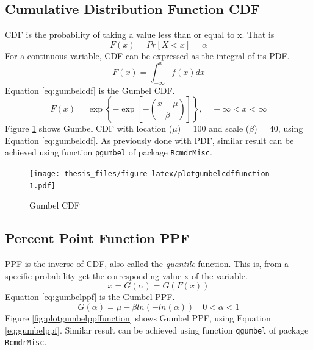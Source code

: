 \documentclass[12pt,oneside]{reedthesis}
\begin{document}
\hypertarget{cumulative-distribution-function-cdf}{%
\subsection{Cumulative Distribution Function CDF}\label{cumulative-distribution-function-cdf}}

CDF is the probability of taking a value less than or equal to x. That is
\begin{equation}
        F(x) = Pr[X < x] = \alpha
  \label{eq:cdf1}
\end{equation}
For a continuous variable, CDF can be expressed as the integral of its PDF.
\begin{equation}
        F(x) = \int_{-\infty}^x f(x)dx
  \label{eq:cdf2}
\end{equation}
Equation \eqref{eq:gumbelcdf} is the Gumbel CDF.
\begin{equation}
        F(x) = \exp\left\{-\exp\left[-\left(\frac{x-\mu}{\beta}\right)\right]\right\}, 
        \quad -\infty < x < \infty
  \label{eq:gumbelcdf}
\end{equation}
Figure \ref{fig:plotgumbelcdffunction} shows Gumbel CDF with location (\(\mu\)) = 100 and scale (\(\beta\)) = 40, using Equation \eqref{eq:gumbelcdf}. As previously done with PDF, similar result can be achieved using function \texttt{pgumbel} of package \texttt{RcmdrMisc}.

\footnotesize
\begin{figure}
\centering
\texttt{[image: thesis\_files/figure-latex/plotgumbelcdffunction-1.pdf]}
\caption{\label{fig:plotgumbelcdffunction}Gumbel CDF}
\end{figure}
\normalsize

\hypertarget{percent-point-function-ppf}{%
\subsection{Percent Point Function PPF}\label{percent-point-function-ppf}}

PPF is the inverse of CDF, also called the \emph{quantile} function. This is, from a specific probability get the corresponding value x of the variable.
\begin{equation}
        x = G(\alpha) = G(F(x))
  \label{eq:ppf}
\end{equation}
Equation \eqref{eq:gumbelppf} is the Gumbel PPF.
\begin{equation}
        G(\alpha) = \mu-\beta ln(-ln(\alpha))
        \quad 0 < \alpha < 1
  \label{eq:gumbelppf}
\end{equation}
Figure \ref{fig:plotgumbelppffunction} shows Gumbel PPF, using Equation \eqref{eq:gumbelppf}. Similar result can be achieved using function \texttt{qgumbel} of package \texttt{RcmdrMisc}.
\end{document}
